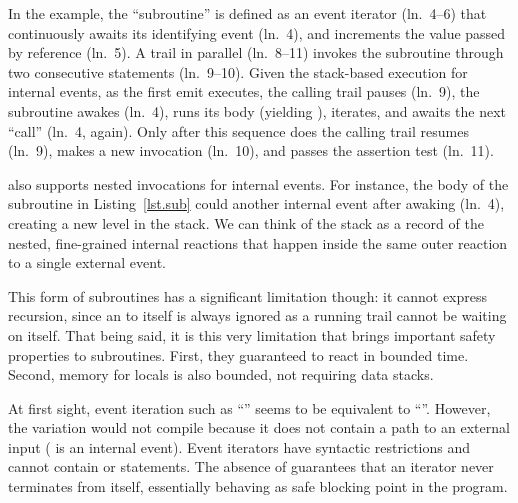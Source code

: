 In the example, the ``subroutine''  is defined as an event iterator
(ln.~4--6) that continuously awaits its identifying event (ln.~4), and
increments the value passed by reference (ln.~5).
%
A trail in parallel (ln.~8--11) invokes the subroutine through two consecutive
 statements (ln.~9--10).
%
Given the stack-based execution for internal events, as the first emit
executes, the calling trail pauses (ln.~9), the subroutine awakes (ln.~4), runs
its body (yielding ), iterates, and awaits the next ``call'' (ln.~4,
again).
%
Only after this sequence does the calling trail resumes (ln.~9), makes a new
invocation (ln.~10), and passes the assertion test (ln.~11).


\CEU also supports nested  invocations for internal events.
%
For instance, the body of the subroutine  in Listing~\ref{lst.sub}
could  another internal event after awaking (ln.~4), creating a
new level in the stack.
%
We can think of the stack as a record of the nested, fine-grained internal
reactions that happen inside the same outer reaction to a single external
event.

This form of subroutines has a significant limitation though: it cannot
express recursion, since an  to itself is always ignored as a
running trail cannot be waiting on itself.
%
That being said, it is this very limitation that brings important safety
properties to subroutines.
%
First, they guaranteed to react in bounded time.
%
Second, memory for locals is also bounded, not requiring data stacks.

At first sight, event iteration such as ``'' seems
to be equivalent to ``''.
However, the  variation would not compile because it does not
contain a path to an external input  ( is an internal
event).
Event iterators have syntactic restrictions and cannot contain  or
 statements.
The absence of  guarantees that an iterator never terminates from
itself, essentially behaving as safe blocking point in the program.

